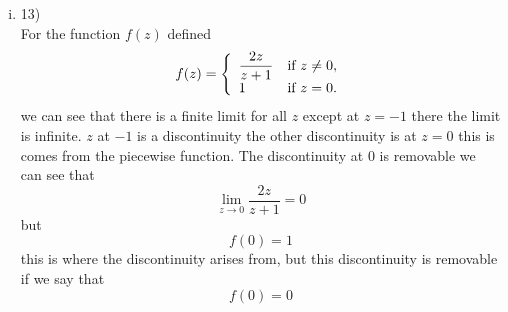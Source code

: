 \documentclass[11pt]{article}
\begin{document}
\begin{enumerate}
\begin{enumerate}[(i)]
\item 13)\\
For the function $f(z)$ defined
$$f(z) = \left\{\begin{array}{lr}
		\dfrac{2z}{z+1} &\textnormal{if}\ z\ne 0,\\
		1 &\textnormal{if}\ z= 0.\\
		\end{array}\right.$$
we can see that there is a finite limit for all $z$ except at $z=-1$ there the limit is infinite. $z$ at $-1$ is a discontinuity the other discontinuity is at $z=0$ this is comes from the piecewise function. The discontinuity at $0$ is removable we can see that 
$$\lim_{z\rightarrow 0} \frac{2z}{z+1} = 0$$ but $$f(0) = 1$$ this is where the discontinuity arises from, but this discontinuity is removable if we say that $$f(0) = 0$$


\end{enumerate}
\end{enumerate}
\end{document}
